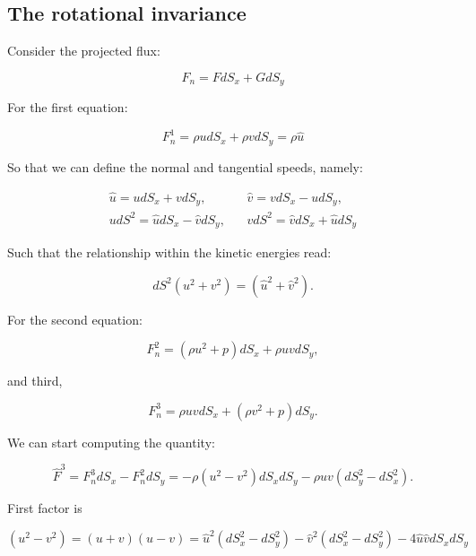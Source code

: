 \documentclass[10pt,a4paper]{article}
\begin{document}
\subsection{The rotational invariance}

Consider the projected flux:

\begin{equation}
F_n = F dS_x + GdS_y
\end{equation}

For the first equation:

\begin{equation}
F^1_n = \rho u dS_x+ \rho v dS_y= \rho \hat{u} 	
\end{equation}

So that we can define the normal and tangential speeds, namely:

\begin{equation}
\begin{split}
\hat{u} = u dS_x + v dS_y, &~~~~\hat{v} = v dS_x - u dS_y,	\\
udS^2 = \hat{u}dS_x - \hat{v} dS_y, & ~~~~ v dS^2 = \hat{v}dS_x + \hat{u} dS_y
\end{split}
\end{equation}

Such that the relationship within the kinetic energies read:

\begin{equation}
dS^2 (u^2 + v^2) = ( \hat{u}^2 + \hat{v}^2).	
\end{equation}


For the second equation:

\begin{equation}
F^2_n = (\rho u^2 + p) dS_x + \rho u v dS_y,
\end{equation}

and third,

\begin{equation}
	F_n^3 = \rho u v dS_x + (\rho v^2 + p ) dS_y.
\end{equation}

We can start computing the quantity:

\begin{equation}
	\hat{F}^3 = F_n^3 dS_x - F_n^2  dS_y 	 = -\rho (u^2-v^2) dS_x dS_y - \rho u v(dS_y^2 - dS_x^2).
\end{equation}

First factor is 

\begin{equation}
(u^2-v^2) =(u+v)(u-v) = \hat{u}^2(dS_x^2-dS_y^2)-\hat{v}^2(dS_x^2 - dS_y^2) - 4\hat{u}\hat{v}dS_x dS_y 
\end{equation}
\end{document}
